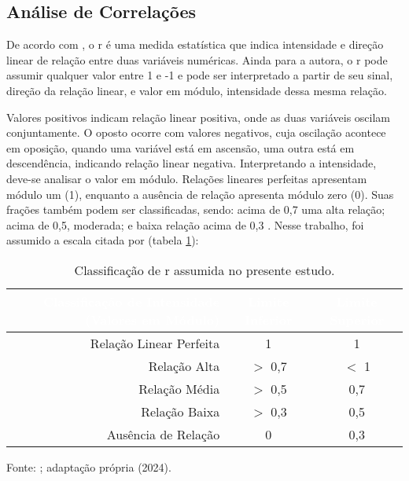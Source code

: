\subsection{Análise de Correlações}

\indent De acordo com , o \acrfull{r} é uma medida estatística que indica intensidade e direção linear de relação entre duas variáveis numéricas. Ainda para a autora, o \acrlong{r} pode assumir qualquer valor entre 1 e -1 e pode ser interpretado a partir de seu sinal, direção da relação linear, e valor em módulo, intensidade dessa mesma relação.

\indent Valores positivos indicam relação linear positiva, onde as duas variáveis oscilam conjuntamente. O oposto ocorre com valores negativos, cuja oscilação acontece em oposição, quando uma variável está em ascensão, uma outra está em descendência, indicando relação linear negativa. Interpretando a intensidade, deve-se analisar o valor em módulo. Relações lineares perfeitas apresentam módulo um (1), enquanto a ausência de relação apresenta módulo zero (0). Suas frações também podem ser classificadas, sendo: acima de 0,7 uma alta relação; acima de 0,5, moderada; e baixa relação acima de 0,3 \cite{StatsDummies}. Nesse trabalho, foi assumido a escala citada por  (tabela \ref{tab:class_corr}):

\begin{table}[htbp]
    \begin{center}
    \caption{Classificação de \acrfull{r} assumida no presente estudo.}
    {
    \begin{tabular}{r|cc}
    \hline
    \toprule
    \rowcolor{darkgray} \textcolor{white}{Classificação de Intensidade (Valores em Módulo)} & \textcolor{white}{Limite Inferior} & \textcolor{white}{Limite Superior}\\
    \midrule
    Relação Linear Perfeita & 1 & 1\\
    Relação Alta & $>$  0,7 & $<$ 1\\
    Relação Média & $>$  0,5 & 0,7\\
    Relação Baixa & $>$  0,3 & 0,5\\
    Ausência de Relação & 0 & 0,3\\
    \bottomrule
    \end{tabular}}
    \label{tab:class_corr}
    \end{center}
    \small{Fonte: ; adaptação própria (2024).}
\end{table}

